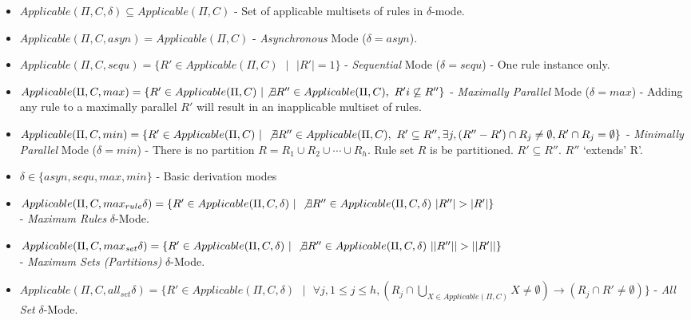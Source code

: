 \documentclass[a4paper]{article}
\theoremstyle{definition}
\newcommand{\ts}{\text{ }}
\begin{document}
\begin{itemize}                                                                                       
   \item $Applicable(\Pi, C, \delta) \subseteq Applicable(\Pi, C)$ - Set of applicable multisets of 
         rules in $\delta$-mode.                                                                                 
   \item $Applicable(\Pi, C, asyn) = Applicable(\Pi, C)$ - \textit{Asynchronous} Mode ($\delta = 
         asyn$).            
   \item $Applicable(\Pi, C, sequ) = \{R' \in Applicable(\Pi, C) \ts | \ts |R'|=1\}$ - 
         \textit{Sequential} Mode ($\delta = sequ$) - One rule instance only.                                                         
   \item $Applicable(\Pi, C, max) = \{R' \in Applicable(\Pi, C) \ts | \not\exists R'' \in Applicable(\Pi, C), \ts R' i   
         \not\subseteq R'' \}$ - \textit{Maximally Parallel} Mode ($\delta = max$) - Adding any rule 
         to a maximally parallel $R'$ will result in an inapplicable multiset of rules.                 
   \item $Applicable(\Pi, C, min) = \{R' \in Applicable(\Pi, C) \ts | \ts \not\exists R'' \in Applicable(\Pi,C), \ts R'   
         \subseteq R'', \exists j, (R''-R') \cap R_j \neq \emptyset, R' \cap R_j = \emptyset\}$                                                                                              
         - \textit{Minimally Parallel} Mode ($\delta = min$) - There is no partition                    
          $R = R_1 \cup R_2 \cup \cdots \cup R_h$. Rule set $R$ is be partitioned.                      
          $R' \subseteq R''$. $R''$ `extends' R'.                                                       
   \item $\delta \in \{asyn, sequ, max, min\}$ - Basic derivation modes                                 
   \item $Applicable(\Pi, C, max_{rule}\delta) = \{R' \in Applicable(\Pi, C, \delta) \ts | \ts \not\exists R''        
         \in Applicable(\Pi,C, \delta) \ts |R''| > |R'|\}$\\ - \textit{Maximum Rules} $\delta$-Mode.           
   \item $Applicable(\Pi, C, max_{set}\delta) = \{R' \in Applicable(\Pi, C, \delta) \ts | \ts \not\exists R'' \in  
         Applicable(\Pi,C, \delta) \ts ||R''|| > ||R'||\}$\\ - \textit{Maximum Sets (Partitions)} $            
         \delta$-Mode.                                                                                  
   \item $Applicable(\Pi, C, all_{set}\delta) = \{R' \in Applicable(\Pi, C, \delta) \ts | \ts \forall j, 1 \leq j  
         \leq h, (R_j \cap \bigcup_{X \in Applicable(\Pi,C)} X \neq \emptyset) \rightarrow (R_j \cap R'    
         \neq \emptyset)\}$ - \textit{All Set} $\delta$-Mode.                                           
\end{itemize}
\end{document}
